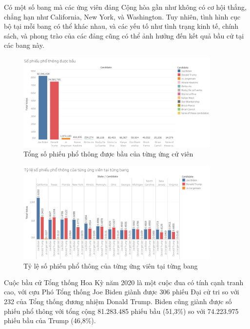 \documentclass[14pt, a4paper]{article}
\numberwithin{equation}{section}
\numberwithin{figure}{section}
\numberwithin{dl}{section}
\numberwithin{md}{section}
\numberwithin{bd}{section}
\numberwithin{dn}{section}
\numberwithin{hq}{section}
\begin{document}
    Có một số bang mà các ứng viên đảng Cộng hòa gần như không có cơ hội thắng, chẳng hạn như California, New York, và Washington. 
    Tuy nhiên, tình hình cục bộ tại mỗi bang có thể khác nhau, và các yếu tố như tình trạng kinh tế, chính sách, và phong trào của các đảng cũng có thể ảnh hưởng đến kết quả bầu cử tại các bang này.

    \begin{figure}[h!]
        \centering
        \includegraphics[width=0.9\textwidth]{Total_Popular_Votes_Candidates_Bar_Chart.png}
        \caption{Tổng số phiếu phổ thông được bầu của từng ứng cử viên}
    \end{figure}

    \begin{figure}[h!]
        \centering
        \includegraphics[width=0.9\textwidth]{Percentage_Popular_Votes_Candidates_by_States.png}
        \caption{Tỷ lệ số phiếu phổ thông của từng ứng viên tại từng bang}
    \end{figure}

    Cuộc bầu cử Tổng thống Hoa Kỳ năm 2020 là một cuộc đua có tính cạnh tranh cao, với cựu Phó Tổng thống Joe Biden giành được 306 phiếu Đại cử tri so với 232 của Tổng thống đương nhiệm Donald Trump. 
    Biden cũng giành được số phiếu phổ thông với tổng cộng 81.283.485 phiếu bầu (51,3\%) so với 74.223.975 phiếu bầu của Trump (46,8\%).
\end{document}
